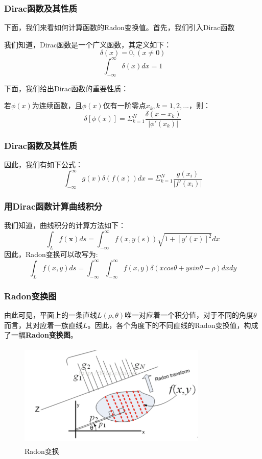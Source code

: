 \documentclass{beamer}
\begin{document}
\begin{frame}
\frametitle{Dirac函数及其性质}
下面，我们来看如何计算函数的Radon变换值。首先，我们引入Dirac函数\pause

我们知道，Dirac函数是一个广义函数，其定义如下：
\begin{equation}
\delta(x)=0,(x\neq0)
\end{equation}
\begin{equation}
\int^{\infty}_{-\infty}\delta(x)dx=1
\end{equation}\pause

下面，我们给出Dirac函数的重要性质：
\begin{theorem}
若$\phi(x)$为连续函数，且$\phi(x)$仅有一阶零点$x_k,k=1,2,...$，则：
\begin{equation}
\delta[\phi(x)]=\Sigma^N_{k=1}\frac{\delta(x-x_k)}{|\phi'(x_k)|}
\end{equation}
\end{theorem}\pause
\end{frame}
\begin{frame}
\frametitle{Dirac函数及其性质}
因此，我们有如下公式：
\begin{equation}
\int^{\infty}_{-\infty}g(x)\delta(f(x))dx=\Sigma^N_{k=1}\frac{g(x_i)}{|f'(x_i)|}
\end{equation}
\end{frame}
\begin{frame}
\frametitle{用Dirac函数计算曲线积分}
我们知道，曲线积分的计算方法如下：
\begin{equation}
\int_Lf(\textbf{x})ds=\int^{\infty}_{-\infty}f(x,y(s))\sqrt{1+[y'(x)]^2}dx
\end{equation}\pause
因此，Radon变换可以改写为:
\begin{equation}
\int_Lf(x,y)ds=\int^{\infty}_{-\infty}\int^{\infty}_{-\infty}f(x,y)\delta(xcos\theta+ysin\theta-\rho)dxdy
\end{equation}
\end{frame}
\begin{frame}
\frametitle{Radon变换图}

由此可见，平面上的一条直线$L(\rho,\theta)$唯一对应着一个积分值，对于不同的角度$\theta$而言，其对应着一族直线$L$。因此，各个角度下的不同直线的Radon变换值，构成了一幅\textbf{Radon变换图}。
\begin{figure}[!h]
\centering
\includegraphics[height=5cm,width=9cm]{2022120901.png}
\caption{Radon变换}
\end{figure}
\end{frame}
\end{document}
